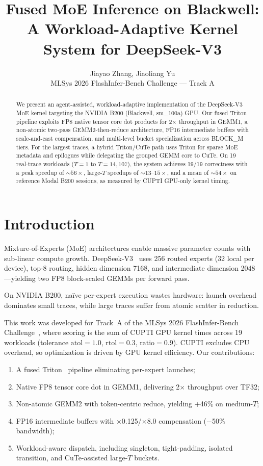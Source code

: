 \documentclass[11pt,twocolumn]{article}
\title{\textbf{Fused MoE Inference on Blackwell:\\A Workload-Adaptive Kernel System for DeepSeek-V3}}
\author{
Jiayao Zhang, Jiaoliang Yu \\
MLSys 2026 FlashInfer-Bench Challenge --- Track A
}
\date{}
\begin{document}
\maketitle

\begin{abstract}
We present an agent-assisted, workload-adaptive implementation of the DeepSeek-V3 MoE kernel targeting the NVIDIA B200 (Blackwell, sm\_100a) GPU.
Our fused Triton pipeline exploits FP8 native tensor core dot products for 2$\times$ throughput in GEMM1, a non-atomic two-pass GEMM2-then-reduce architecture, FP16 intermediate buffers with scale-and-cast compensation, and multi-level bucket specialization across BLOCK\_M tiers.
For the largest traces, a hybrid Triton/CuTe path uses Triton for sparse MoE metadata and epilogues while delegating the grouped GEMM core to CuTe.
On 19 real-trace workloads ($T{=}1$ to $T{=}14{,}107$), the system achieves 19/19 correctness with a peak speedup of ${\sim}56\times$, large-$T$ speedups of ${\sim}13$--$15\times$, and a mean of ${\sim}54\times$ on reference Modal B200 sessions, as measured by CUPTI GPU-only kernel timing.
\end{abstract}

\section{Introduction}

Mixture-of-Experts (MoE) architectures enable massive parameter counts with sub-linear compute growth.
DeepSeek-V3~\cite{deepseekv3} uses 256 routed experts (32 local per device), top-8 routing, hidden dimension 7168, and intermediate dimension 2048---yielding two FP8 block-scaled GEMMs per forward pass.

On NVIDIA B200, na\"ive per-expert execution wastes hardware: launch overhead dominates small traces, while large traces suffer from atomic scatter in reduction.

This work was developed for Track~A of the MLSys 2026 FlashInfer-Bench Challenge~\cite{flashinfer}, where scoring is the sum of CUPTI GPU kernel times across 19 workloads (tolerance $\text{atol}{=}1.0$, $\text{rtol}{=}0.3$, $\text{ratio}{=}0.9$).
CUPTI excludes CPU overhead, so optimization is driven by GPU kernel efficiency.
Our contributions:

\begin{enumerate}
\item A fused Triton~\cite{triton} pipeline eliminating per-expert launches;
\item Native FP8 tensor core dot in GEMM1, delivering 2$\times$ throughput over TF32;
\item Non-atomic GEMM2 with token-centric reduce, yielding +46\% on medium-$T$;
\item FP16 intermediate buffers with $\times$0.125/$\times$8.0 compensation ($-$50\% bandwidth);
\item Workload-aware dispatch, including singleton, tight-padding, isolated transition, and CuTe-assisted large-$T$ buckets.
\end{enumerate}
\end{document}
